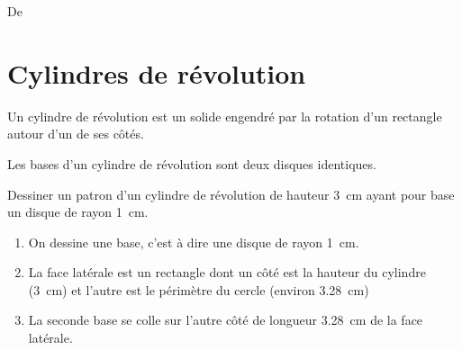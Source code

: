 
De \cite{NRHooXFvgpp5}


\section{Cylindres de révolution}

\begin{definition}
Un cylindre de révolution est un solide engendré par la rotation d'un rectangle autour d'un de ses côtés.
\end{definition}

\begin{propriete}
   Les bases d'un cylindre de révolution sont deux disques identiques.
\end{propriete}


\begin{example}
    Dessiner un patron d'un cylindre de révolution de hauteur \SI{3}{\centi\meter} ayant pour base un disque de rayon \SI{1}{\centi\meter}.



    \begin{enumerate}
        \item
            On dessine une base, c'est à dire une disque de rayon \SI{1}{\centi\meter}.
\begin{center}
   
\end{center}
        \item


            La face latérale est un rectangle dont un côté est la hauteur du cylindre (\SI{3}{\centi\meter}) et l'autre est le périmètre du cercle (environ \SI{3.28}{\centi\meter})


\begin{center}
   
\end{center}

        \item
            La seconde base se colle sur l'autre côté de longueur \SI{3.28}{\centi\meter} de la face latérale.
\begin{center}
   
\end{center}
    \end{enumerate}
\end{example}
